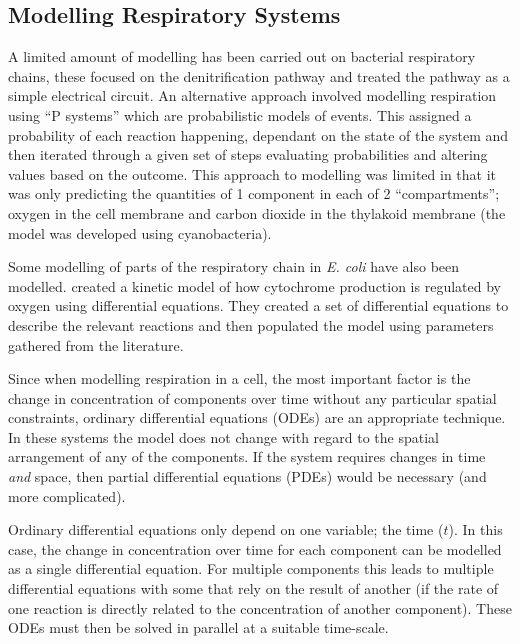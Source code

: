 \subsection{Modelling Respiratory Systems}

A limited amount of modelling has been carried out on bacterial respiratory chains, these focused on the denitrification pathway and treated the pathway as a simple electrical circuit\cite{Almeida1997}. An alternative approach involved modelling respiration using ``P systems'' which are probabilistic models of events. This assigned a probability of each reaction happening, dependant on the state of the system and then iterated through a given set of steps evaluating probabilities and altering values based on the outcome\cite{Cavaliere2006}. This approach to modelling was limited in that it was only predicting the quantities of 1 component in each of 2 ``compartments''; oxygen in the cell membrane and carbon dioxide in the thylakoid membrane (the model was developed using cyanobacteria).

Some modelling of parts of the respiratory chain in \textit{E. coli} have also been modelled. \citet{Peercy2006} created a kinetic model of how cytochrome production is regulated by oxygen using differential equations. They created a set of differential equations to describe the relevant reactions and then populated the model using parameters gathered from the literature.

Since when modelling respiration in a cell, the most important factor is the change in concentration of components over time without any particular spatial constraints, ordinary differential equations (ODEs) are an appropriate technique. In these systems the model does not change with regard to the spatial arrangement of any of the components. If the system requires changes in time \textit{and} space, then partial differential equations (PDEs) would be necessary (and more complicated)\cite{Klipp2005}.

Ordinary differential equations only depend on one variable; the time ($t$). In this case, the change in concentration over time for each component can be modelled as a single differential equation. For multiple components this leads to multiple differential equations with some that rely on the result of another (if the rate of one reaction is directly related to the concentration of another component). These ODEs must then be solved in parallel at a suitable time-scale.


